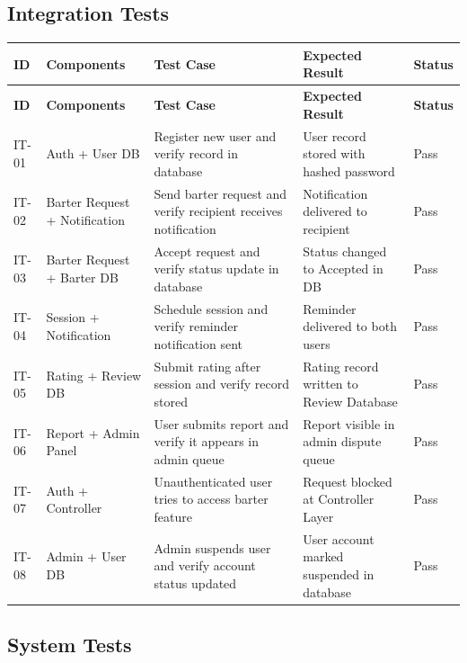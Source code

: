 \documentclass[12pt,a4paper]{article}
\begin{document}
\subsection{Integration Tests}
\vspace{4pt}

\begin{longtable}{L{0.8cm} L{3.5cm} L{4cm} L{3cm} L{2.5cm}}
\toprule
\textbf{ID} & \textbf{Components} & \textbf{Test Case} & \textbf{Expected Result} & \textbf{Status} \\
\midrule
\endfirsthead
\toprule
\textbf{ID} & \textbf{Components} & \textbf{Test Case} & \textbf{Expected Result} & \textbf{Status} \\
\midrule
\endhead
\bottomrule
\endfoot
IT-01 & Auth + User DB & Register new user and verify record in database & User record stored with hashed password & Pass \\
IT-02 & Barter Request + Notification & Send barter request and verify recipient receives notification & Notification delivered to recipient & Pass \\
IT-03 & Barter Request + Barter DB & Accept request and verify status update in database & Status changed to Accepted in DB & Pass \\
IT-04 & Session + Notification & Schedule session and verify reminder notification sent & Reminder delivered to both users & Pass \\
IT-05 & Rating + Review DB & Submit rating after session and verify record stored & Rating record written to Review Database & Pass \\
IT-06 & Report + Admin Panel & User submits report and verify it appears in admin queue & Report visible in admin dispute queue & Pass \\
IT-07 & Auth + Controller & Unauthenticated user tries to access barter feature & Request blocked at Controller Layer & Pass \\
IT-08 & Admin + User DB & Admin suspends user and verify account status updated & User account marked suspended in database & Pass \\
\bottomrule
\end{longtable}

\subsection{System Tests}
\vspace{4pt}
\end{document}
